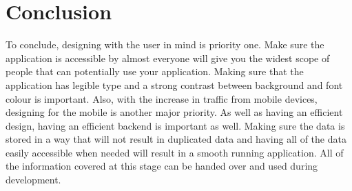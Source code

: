 \section{Conclusion}
To conclude, designing with the user in mind is priority one. Make sure the application is accessible by almost everyone will give you the widest scope of people that can potentially use your application. Making sure that the application has legible type and a strong contrast between background and font colour is important. Also, with the increase in traffic from mobile devices, designing for the mobile is another major priority. As well as having an efficient design, having an efficient backend is important as well. Making sure the data is stored in a way that will not result in duplicated data and having all of the data easily accessible when needed will result in a smooth running application. All of the information covered at this stage can be handed over and used during development.